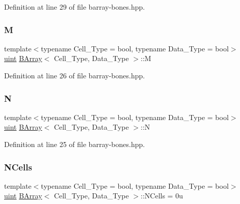 Definition at line 29 of file barray-\/bones.\+hpp.

\mbox{\label{class_b_array_a197359753fd1bc054a1a14f7641d3fd1}} 
\subsubsection{\texorpdfstring{M}{M}}
{\footnotesize\ttfamily template$<$typename Cell\+\_\+\+Type = bool, typename Data\+\_\+\+Type = bool$>$ \\
\hyperlink{typedefs_8hpp_a91ad9478d81a7aaf2593e8d9c3d06a14}{uint} \hyperlink{class_b_array}{B\+Array}$<$ Cell\+\_\+\+Type, Data\+\_\+\+Type $>$\+::M}



Definition at line 26 of file barray-\/bones.\+hpp.

\mbox{\label{class_b_array_a4b34ec8636c989efe80bbe3f1cea217e}} 
\subsubsection{\texorpdfstring{N}{N}}
{\footnotesize\ttfamily template$<$typename Cell\+\_\+\+Type = bool, typename Data\+\_\+\+Type = bool$>$ \\
\hyperlink{typedefs_8hpp_a91ad9478d81a7aaf2593e8d9c3d06a14}{uint} \hyperlink{class_b_array}{B\+Array}$<$ Cell\+\_\+\+Type, Data\+\_\+\+Type $>$\+::N}



Definition at line 25 of file barray-\/bones.\+hpp.

\mbox{\label{class_b_array_a31fd64c6b54408ca98e07abc9c4241c5}} 
\subsubsection{\texorpdfstring{N\+Cells}{NCells}}
{\footnotesize\ttfamily template$<$typename Cell\+\_\+\+Type = bool, typename Data\+\_\+\+Type = bool$>$ \\
\hyperlink{typedefs_8hpp_a91ad9478d81a7aaf2593e8d9c3d06a14}{uint} \hyperlink{class_b_array}{B\+Array}$<$ Cell\+\_\+\+Type, Data\+\_\+\+Type $>$\+::N\+Cells = 0u}



